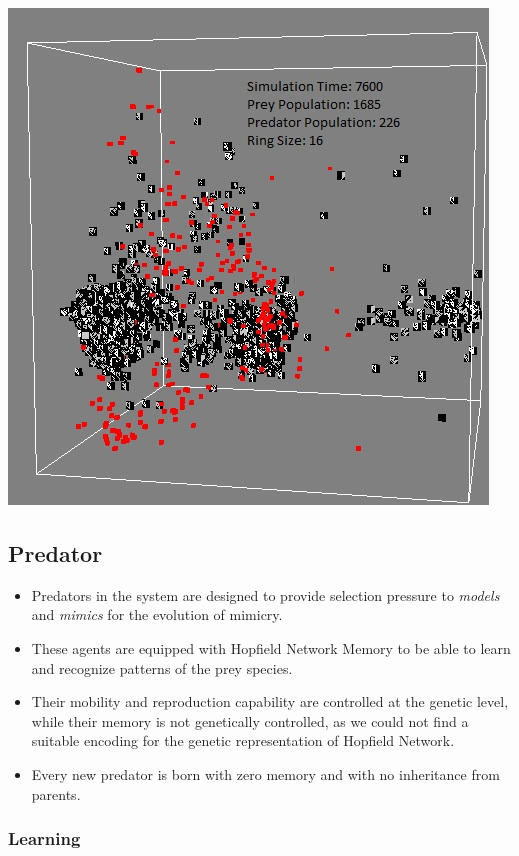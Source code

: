 \documentclass[a0,landscape]{a0poster}
\begin{document}
\begin{multicols}{5}
\begin{center}\vspace{1cm}
\includegraphics[width=0.5\linewidth]{simTime7600.png}
\end{center}\vspace{1cm}

\color{SaddleBrown} 
\subsection*{Predator}

\begin{itemize}
	\item Predators in the system are designed to provide selection pressure to \textit{models} and \textit{mimics} for the evolution of mimicry. 
	\item These agents are equipped with Hopfield Network Memory to be able to learn and recognize patterns of the prey species.
	\item Their mobility and reproduction capability are controlled at the genetic level, while their memory is not genetically controlled, as we could not find a suitable encoding for the genetic representation of Hopfield Network.
	\item Every new predator is born with zero memory and with no inheritance from parents.
\end{itemize}

\color{DarkSlateGray}
\subsubsection*{Learning}


\end{multicols}
\end{document}
